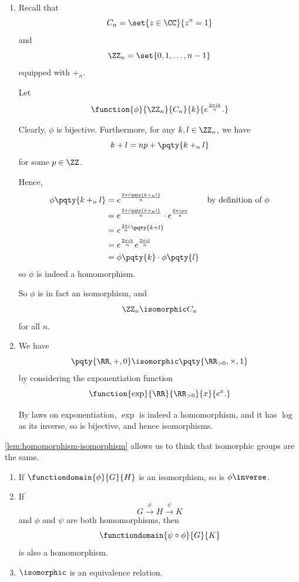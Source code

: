 \begin{examples*}
    \begin{enumerate}
        \item Recall that
        \[
            C_n = \set{z \in \CC}{z^n = 1}
        \]
        and
        \[
            \ZZ_n = \set{0, 1, \ldots, n - 1}
        \]
        equipped with \(+_n\).

        Let
        \[
            \function{\phi}{\ZZ_n}{C_n}{k}{e^{\frac{2 \pi i k}{n}}.}
        \]

        Clearly, \(\phi\) is bijective. Furthermore, for any \(k, l \in \ZZ_{n}\), we have
        \[
            k + l = np + \pqty{k +_n l}
        \]
        for some \(p \in \ZZ\).

        Hence,
        \begin{align*}
            \phi\pqty{k +_n l} &= e^{\frac{2 \pi i \pqty{k +_n l}}{n}} && \text{by definition of }\phi \\
            &= e^{\frac{2 \pi i \pqty{k +_n l}}{n}} \cdot e^{\frac{2 \pi i p n}{n}} \\
            &= e^{\frac{2 \pi i}{n} \pqty{k + l}} \\
            &= e^{\frac{2 \pi i k}{n}} e^{\frac{2 \pi i l}{n}} \\
            &= \phi\pqty{k} \cdot \phi\pqty{l}
        \end{align*}
        so \(\phi\) is indeed a homomorphism.

        So \(\phi\) is in fact an isomorphism, and
        \[
            \ZZ_{n} \isomorphic C_n
        \]
        for all \(n\).

        \item We have
        \[
            \pqty{\RR, +, 0} \isomorphic \pqty{\RR_{>0}, \times, 1}
        \]
        by considering the exponentiation function
        \[
            \function{\exp}{\RR}{\RR_{>0}}{x}{e^x.}
        \]

        By laws on exponentiation, \(\exp\) is indeed a homomorphism, and it has \(\log\) as its inverse, so is bijective, and hence isomorphisms.
    \end{enumerate}
\end{examples*}

\autoref{lem:homomorphism-isomorphism} allows us to think that isomorphic groups are the same.

\begin{lemma}
    \label{lem:homomorphism-isomorphism}%
    \begin{enumerate}
        \item If \(\functiondomain{\phi}{G}{H}\) is an isomorphism, so is \(\phi \inverse\).
        \item If
        \[
            G \xrightarrow{\phi} H \xrightarrow{\psi} K
        \]
        and \(\phi\) and \(\psi\) are both homomorphisms, then
        \[
            \functiondomain{\psi \circ \phi}{G}{K}
        \]
        is also a homomorphism.
        \item \(\isomorphic\) is an equivalence relation.
    \end{enumerate}
\end{lemma}

